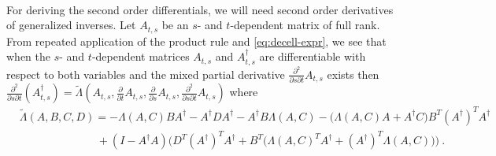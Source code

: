 \documentclass[final]{svjour3}
\newcommand{\pfc}[2]{\tfrac{\partial}{\partial #2}#1}
\newcommand{\pfcc}[3]{\tfrac{\partial^2}{\partial #2\partial #3}#1}
\begin{document}
\ \\
For deriving the second order differentials, we will 
need second order derivatives of generalized inverses.
Let $A_{t,s}$ be an $s$- and $t$-dependent matrix of full rank.
From repeated application of the product rule and
\eqref{eq:decell-expr}, we see that 
when the $s$- and $t$-dependent matrices $A_{t,s}$ and $A_{t,s}^\dagger$ are 
differentiable with respect to both variables
and the mixed partial derivative $\pfcc{A_{t,s}}{s}{t}$ exists then
$\tfrac{\partial^2}{\partial s\partial t}(A_{t,s}^\dagger)
=
\tilde{\Lambda}(A_{t,s},\pfc{A_{t,s}}{t},\pfc{A_{t,s}}{s},\pfcc{A_{t,s}}{s}{t})$
where
\begin{equation}
   \begin{split}
    &\tilde{\Lambda}(A,B,C,D)
    =
    -\Lambda(A,C)BA^\dagger
    -A^\dagger DA^\dagger
    -A^\dagger B\Lambda(A,C)
    -\Big(\Lambda(A,C)A
    +A^\dagger C\Big)B^T(A^\dagger)^TA^\dagger
    \\
    &\qquad\qquad\qquad\quad
    +(I-A^\dagger A)
     \Big(D^T(A^\dagger)^TA^\dagger
     +B^T\big(\Lambda(A,C)^TA^\dagger
     +(A^\dagger)^T\Lambda(A,C)\big)\Big)
   \ .
   \end{split}
     \label{eq:second-deriv}
\end{equation}
\end{document}
